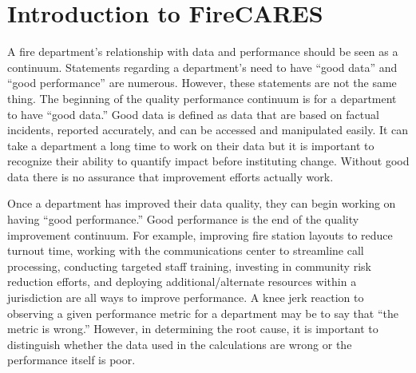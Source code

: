 \documentclass[12pt,oneside]{book}
\begin{document}



\newpage

\cleardoublepage



\renewcommand*\contentsname{\color{fc_blue}Contents}
\tableofcontents

\hypersetup{ 
    linkcolor=fc_orange,         %
    filecolor=fc_orange,      %
    urlcolor=fc_orange,           %
}    

\newpage
\mainmatter

\chapter{Introduction to FireCARES}

A fire department's relationship with data and performance should be seen as a continuum. Statements regarding a department's need to have ``good data'' and ``good performance'' are numerous. However, these statements are not the same thing. The beginning of the quality performance continuum is for a department to have ``good data.'' Good data is defined as data that are based on factual incidents, reported accurately, and can be accessed and manipulated easily. It can take a department a long time to work on their data but it is important to recognize their ability to quantify impact before instituting change. Without good data there is no assurance that improvement efforts actually work.

Once a department has improved their data quality, they can begin working on having ``good performance.'' Good performance is the end of the quality improvement continuum. For example, improving fire station layouts to reduce turnout time, working with the communications center to streamline call processing, conducting targeted staff training, investing in community risk reduction efforts, and deploying additional/alternate resources within a jurisdiction are all ways to improve performance. 
A knee jerk reaction to observing a given performance metric for a department may be to say that ``the metric is wrong.'' However, in determining the root cause, it is important to distinguish whether the data used in the calculations are wrong or the performance itself is poor.  
\end{document}
